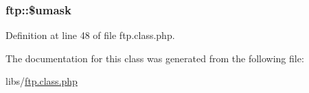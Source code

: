 \hypertarget{classftp_a40322387fc5aa5074daf7aaa4b7aa742}{
\subsubsection[{\$umask}]{\setlength{\rightskip}{0pt plus 5cm}ftp\+::\$umask}}\label{classftp_a40322387fc5aa5074daf7aaa4b7aa742}


Definition at line 48 of file ftp.\+class.\+php.



The documentation for this class was generated from the following file\+:\begin{DoxyCompactItemize}
\item 
libs/\hyperlink{ftp_8class_8php}{ftp.\+class.\+php}\end{DoxyCompactItemize}
